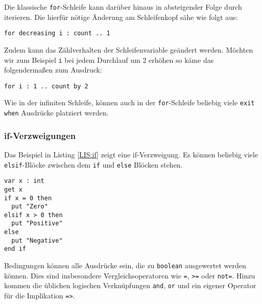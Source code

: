 Die klassische \texttt{for}-Schleife kann dar\"uber hinaus in absteigender Folge durch iterieren. Die hierf\"ur n\"otige \"Anderung am Schleifenkopf s\"ahe wie folgt aus: 

\begin{table}[h!]
\begin{lstlisting}
for decreasing i : count .. 1
\end{lstlisting}
\end{table}

Zudem kann das Z\"ahlverhalten der Schleifenvariable ge\"andert werden. M\"ochten wir zum Beispiel \texttt{i} bei jedem Durchlauf um 2 erh\"ohen so k\"ame das folgenderma\ss{}en zum Ausdruck: 

\begin{table}[h!]
\begin{lstlisting}
for i : 1 .. count by 2
\end{lstlisting}
\end{table}

Wie in der infiniten Schleife, k\"onnen auch in der \texttt{for}-Schleife beliebig viele \lstinline{exit when} Ausdr\"ucke platziert werden.

\subsubsection{if-Verzweigungen}

Das Beispiel in Listing \ref{LIS:if} zeigt eine if-Verzweigung. Es k\"onnen beliebig viele \lstinline{elsif}-Bl\"ocke zwischen dem \lstinline{if} und \lstinline{else} Bl\"ocken stehen.

\lstset{label=LIS:if}
\begin{table}[h!]
\begin{lstlisting}
var x : int
get x
if x = 0 then
  put "Zero"
elsif x > 0 then
  put "Positive"
else
  put "Negative"
end if
\end{lstlisting}
\end{table}

Bedingungen k\"onnen alle Ausdr\"ucke sein, die zu \lstinline{boolean} ausgewertet werden k\"onnen. Dies sind insbesondere Vergleichsoperatoren wie \lstinline{=}, \lstinline{>=} oder \lstinline{not=}. Hinzu kommen die \"ublichen logischen Verkn\"upfungen \lstinline{and}, \lstinline{or} und ein eigener Operator f\"ur die Implikation \lstinline{=>}.


